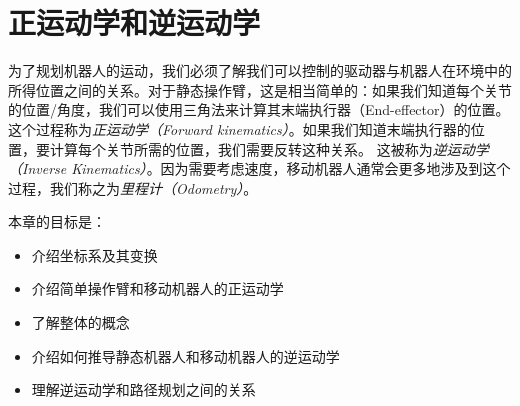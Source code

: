 \chapter{正运动学和逆运动学}
\label{chap:kinematics}


为了规划机器人的运动，我们必须了解我们可以控制的驱动器与机器人在环境中的所得位置之间的关系。对于静态操作臂，这是相当简单的：如果我们知道每个关节的位置/角度，我们可以使用三角法来计算其末端执行器（End-effector）的位置。这个过程称为\emph{正运动学（Forward kinematics）}。如果我们知道末端执行器的位置，要计算每个关节所需的位置，我们需要反转这种关系。 这被称为\emph{逆运动学（Inverse Kinematics）}。因为需要考虑速度，移动机器人通常会更多地涉及到这个过程，我们称之为\emph{里程计（Odometry）}。

本章的目标是：
\begin{itemize}
\item 介绍坐标系及其变换
\item 介绍简单操作臂和移动机器人的正运动学
\item 了解整体的概念
\item 介绍如何推导静态机器人和移动机器人的逆运动学
\item 理解逆运动学和路径规划之间的关系
\end{itemize}

